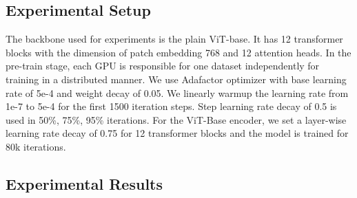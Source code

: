 \documentclass[10pt,twocolumn,letterpaper]{article}
\begin{document}
\subsection{Experimental Setup}
The backbone used for experiments is the plain ViT-base. It has 12 transformer blocks with the dimension of patch embedding 768 and 12 attention heads. In the pre-train stage, each GPU is responsible for one dataset independently for training in a distributed manner. We use Adafactor\cite{shazeer2018adafactor} optimizer with base learning rate of 5e-4 and weight decay of 0.05. We linearly warmup the learning rate from 1e-7 to 5e-4 for the first 1500 iteration steps. Step learning rate decay of 0.5 is used in 50\%, 75\%, 95\% iterations. For the ViT-Base encoder, we set a layer-wise learning rate decay of 0.75 for 12 transformer blocks and the model is trained for 80k iterations.


\subsection{Experimental Results}






    
\end{document}
